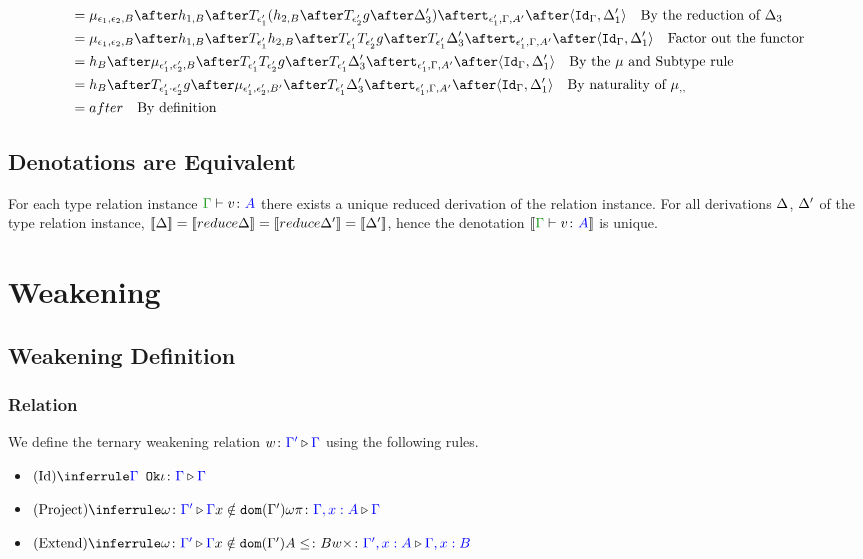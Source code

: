 \documentclass{report}
\begin{document}
\begin{align*}
                &= \bind{\e_1}{\e_2}{B}\after 
                h_{1, B}\after\T{\e_1'}{(h_{2, B}\after\T{\e_2'}{g}\after \D_3')}\after
                \tstrength{\e_1'}{\G}{A'}\after\pr{\idg}{\D_1'}\qt{By the reduction of $\D_3$}\\
                &= \bind{\e_1}{\e_2}{B}\after 
                h_{1, B}\after\T{\e_1'}{h_{2, B}}\after\T{\e_1'}{\T{\e_2'}{g}}\after \T{\e_1'}{\D_3'}\after
                \tstrength{\e_1'}{\G}{A'}\after\pr{\idg}{\D_1'}\qt{Factor out the functor}\\
                &= h_B\after\bind{\e_1'}{\e_2'}{B}\after\T{\e_1'}{\T{\e_2'}{g}}\after \T{\e_1'}{\D_3'}\after
                \tstrength{\e_1'}{\G}{A'}\after\pr{\idg}{\D_1'}\qt{By the $\mu$ and Subtype rule }\\
                & = h_B\after\T{\e_1'\dot\e_2'}{g}\after\bind{\e_1'}{\e_2'}{B'}\after \T{\e_1'}{\D_3'}\after
                \tstrength{\e_1'}{\G}{A'}\after\pr{\idg}{\D_1'}\qt{By naturality of $\bind{}{}{}$ }\\
                & = after \qt{By definition}
            \end{align*}

\section{Denotations are Equivalent}
For each type relation instance $\gtyperelation{v}{A}$ there exists a unique reduced derivation of the relation instance. For all derivations $\Delta$, $\Delta'$ of the type relation instance, $\deno{\D} = \deno{\reduce{\D}} = \deno{\reduce{\D'}} = \deno{\D'} $, hence the denotation $\deno{\gtyperelation{v}{A}}$ is unique.


\chapter{Weakening}
\section{Weakening Definition}
\subsection{Relation}
We define the ternary weakening relation $w \colon {\color{blue}\Gamma'} \triangleright {\color {blue} \Gamma}$ using the following rules.


\begin{itemize}
    \item $\ntreeruleI{Id}{\ok{\G}}{\wrel{\i}{\G}{\G}}$
    \item $\ntreeruleII{Project}{\wrel{\w}{\G'}{\G}}{ x \notin \dom{\G'}}{\wrel{\w \pi}{\G, x: A}{\G}}$
    \item $\ntreeruleIII{Extend}{\wrel{\w}{\G'}{\G}}{ x \notin \dom{\G'}}{ A \subtype B}{\wrel{w \x}{\G', x: A}{\G, x: B}}$
\end{itemize}
\end{document}
